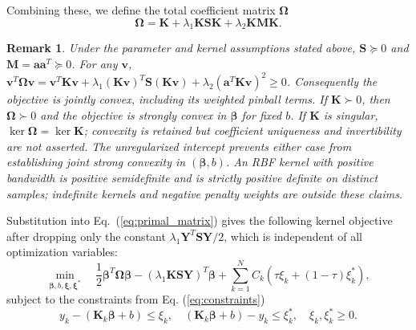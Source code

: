 \documentclass[a4paper]{cas-sc}
\newtheorem{remark}{Remark}
\begin{document}
Combining these, we define the total coefficient matrix $\boldsymbol{\Omega}$
\begin{equation}
\label{eq:Omega}
\boldsymbol{\Omega} = \boldsymbol{K} + \lambda_1 \boldsymbol{K} \mathbf{S} \boldsymbol{K} + \lambda_2 \boldsymbol{K} \mathbf{M} \boldsymbol{K}.
\end{equation}

\begin{remark}
{\color{blue}Under the parameter and kernel assumptions stated above, $\mathbf{S}\succeq0$ and $\mathbf{M}=\boldsymbol{a}\boldsymbol{a}^T\succeq0$. For any $\boldsymbol{v}$, $\boldsymbol{v}^T\boldsymbol{\Omega}\boldsymbol{v}=\boldsymbol{v}^T\boldsymbol{K}\boldsymbol{v}+\lambda_1(\boldsymbol{K}\boldsymbol{v})^T\mathbf{S}(\boldsymbol{K}\boldsymbol{v})+\lambda_2(\boldsymbol{a}^T\boldsymbol{K}\boldsymbol{v})^2\ge0$. Consequently the objective is jointly convex, including its weighted pinball terms. If $\boldsymbol{K}\succ0$, then $\boldsymbol{\Omega}\succ0$ and the objective is strongly convex in $\boldsymbol{\beta}$ for fixed $b$. If $\boldsymbol{K}$ is singular, $\ker\boldsymbol{\Omega}=\ker\boldsymbol{K}$; convexity is retained but coefficient uniqueness and invertibility are not asserted. The unregularized intercept prevents either case from establishing joint strong convexity in $(\boldsymbol{\beta},b)$. An RBF kernel with positive bandwidth is positive semidefinite and is strictly positive definite on distinct samples; indefinite kernels and negative penalty weights are outside these claims.}
\end{remark}
{\color{blue}Substitution into Eq.~(\ref{eq:primal_matrix}) gives the following kernel objective after dropping only the constant $\lambda_1\boldsymbol{Y}^T\mathbf{S}\boldsymbol{Y}/2$, which is independent of all optimization variables:}
\begin{equation}
\label{eq:kernel_primal}
\min_{\boldsymbol{\beta}, b, \boldsymbol{\xi}, \boldsymbol{\xi}^*} \quad \frac{1}{2} \boldsymbol{\beta}^T \boldsymbol{\Omega} \boldsymbol{\beta} - (\lambda_1 \boldsymbol{K} \mathbf{S} \boldsymbol{Y})^T \boldsymbol{\beta} + \sum_{k=1}^N C_k (\tau \xi_k + (1-\tau)\xi_k^*),
\end{equation}
subject to the constraints from Eq. (\ref{eq:constraints})
\begin{equation}
\label{eq:kernel_constraints}
y_k - (\boldsymbol{K}_k \boldsymbol{\beta} + b) \le \xi_k, \quad (\boldsymbol{K}_k \boldsymbol{\beta} + b) - y_k \le \xi_k^*, \quad \xi_k, \xi_k^* \ge 0.
\end{equation}
\end{document}
